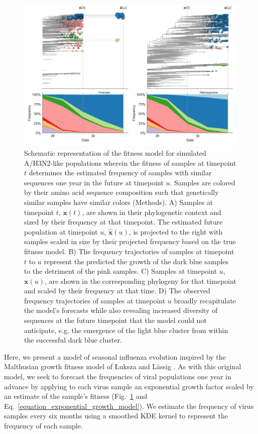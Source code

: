 \begin{figure}[ht]
  \begin{center}
  \includegraphics[width=\columnwidth]{figures/distance-based-fitness-model.png}
  \caption{
    Schematic representation of the fitness model for simulated A/H3N2-like populations wherein the fitness of samples at timepoint $t$ determines the estimated frequency of samples with similar sequences one year in the future at timepoint $u$.
    Samples are colored by their amino acid sequence composition such that genetically similar samples have similar colors (Methods).
    A) Samples at timepoint $t$, $\mathbf{x}(t)$, are shown in their phylogenetic context and sized by their frequency at that timepoint.
    The estimated future population at timepoint $u$, $\mathbf{\hat{x}}(u)$, is projected to the right with samples scaled in size by their projected frequency based on the true fitness model.
    B) The frequency trajectories of samples at timepoint $t$ to $u$ represent the predicted the growth of the dark blue samples to the detriment of the pink samples.
    C) Samples at timepoint $u$, $\mathbf{x}(u)$, are shown in the corresponding phylogeny for that timepoint and scaled by their frequency at that time.
    D) The observed frequency trajectories of samples at timepoint $u$ broadly recapitulate the model's forecasts while also revealing increased diversity of sequences at the future timepoint that the model could not anticipate, e.g. the emergence of the light blue cluster from within the successful dark blue cluster.
  }
  \label{fig:model}
  \end{center}
\end{figure}

Here, we present a model of seasonal influenza evolution inspired by the Malthusian growth fitness model of {\L}uksza and L\"assig \cite{Luksza:2014hj}.
As with this original model, we seek to forecast the frequencies of viral populations one year in advance by applying to each virus sample an exponential growth factor scaled by an estimate of the sample's fitness (Fig.~\ref{fig:model} and Eq.~\ref{equation_exponential_growth_model}).
We estimate the frequency of virus samples every six months using a smoothed KDE kernel to represent the frequency of each sample.

